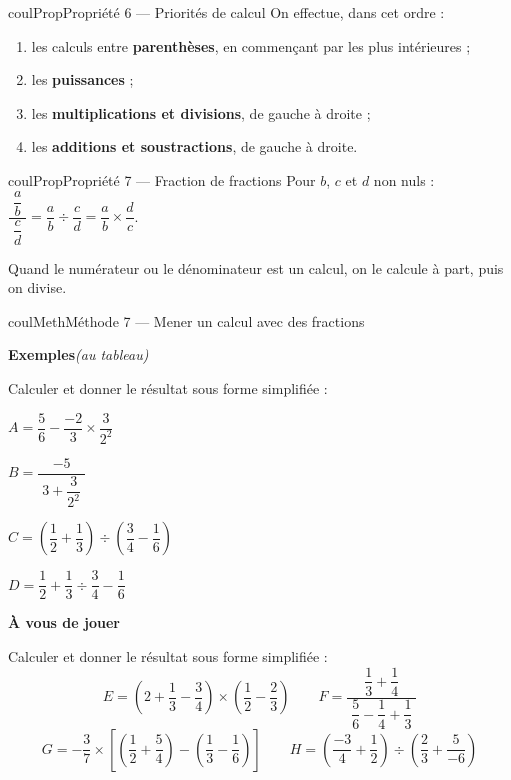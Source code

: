 \documentclass[11pt,a4paper]{article}
\makeatletter
\newcounter{lycee@signet}
\newcommand{\signet}[3][]{\stepcounter{lycee@signet}%
  \edef\lycee@dest{\if\relax\detokenize{#1}\relax
    signet.\arabic{lycee@signet}\else#1\fi}%
  \hypertarget{\lycee@dest}{}\bookmark[level=#2,dest=\lycee@dest]{#3}}
\newcounter{methode}
\newenvironment{proprietebox}[1][Propriété]%
  {\begin{boitecours}[phantom={\signet{2}{#1}}]{coulProp}{#1}}{\end{boitecours}}
\newenvironment{methodebox}[1][Méthode]{\stepcounter{methode}%
  \begin{boitecours}[phantom={\signet[methode-\arabic{methode}]{2}{#1}}]{coulMeth}{#1}}%
  {\end{boitecours}}
\newcommand{\etape}[1]{\par\smallskip\textbf{\color{coulMeth}#1}\par\nobreak\smallskip}
\newcommand{\autableau}{\hfill{\footnotesize\itshape\color{black!45}(au tableau)}}
\newcommand{\etapeexemples}{%
    \par\smallskip\textbf{\color{coulMeth}Exemples}\autableau\par\nobreak\smallskip}
\makeatother
\begin{document}
\begin{proprietebox}[Propriété 6 --- Priorités de calcul]
On effectue, dans cet ordre :
\begin{enumerate}[label=\arabic*.]
  \item les calculs entre \textbf{parenthèses}, en commençant par les plus intérieures ;
  \item les \textbf{puissances} ;
  \item les \textbf{multiplications et divisions}, de gauche à droite ;
  \item les \textbf{additions et soustractions}, de gauche à droite.
\end{enumerate}
\end{proprietebox}

\begin{proprietebox}[Propriété 7 --- Fraction de fractions]
Pour $b$, $c$ et $d$ non nuls : \quad
$\dfrac{\;\dfrac{a}{b}\;}{\;\dfrac{c}{d}\;}=\dfrac{a}{b}\div\dfrac{c}{d}=\dfrac{a}{b}\times\dfrac{d}{c}$.

\smallskip
Quand le numérateur ou le dénominateur est un calcul, on le calcule à part, puis on
divise.
\end{proprietebox}

\begin{methodebox}[Méthode 7 --- Mener un calcul avec des fractions]
\etapeexemples
Calculer et donner le résultat sous forme simplifiée :
\begin{questions}[label=\alph*)]
  \item $A=\dfrac{5}{6}-\dfrac{-2}{3}\times\dfrac{3}{2^{2}}$
  \item $B=\dfrac{-5}{\;3+\dfrac{3}{2^{2}}\;}$
  \item $C=\left(\dfrac{1}{2}+\dfrac{1}{3}\right)\div\left(\dfrac{3}{4}-\dfrac{1}{6}\right)$
  \item $D=\dfrac{1}{2}+\dfrac{1}{3}\div\dfrac{3}{4}-\dfrac{1}{6}$
\end{questions}

\etape{À vous de jouer}
Calculer et donner le résultat sous forme simplifiée :
\[
  E=\left(2+\dfrac{1}{3}-\dfrac{3}{4}\right)\times\left(\dfrac{1}{2}-\dfrac{2}{3}\right)
  \qquad
  F=\dfrac{\;\dfrac{1}{3}+\dfrac{1}{4}\;}{\;\dfrac{5}{6}-\dfrac{1}{4}+\dfrac{1}{3}\;}
\]
\[
  G=-\dfrac{3}{7}\times\left[\left(\dfrac{1}{2}+\dfrac{5}{4}\right)-\left(\dfrac{1}{3}-\dfrac{1}{6}\right)\right]
  \qquad
  H=\left(\dfrac{-3}{4}+\dfrac{1}{2}\right)\div\left(\dfrac{2}{3}+\dfrac{5}{-6}\right)
\]

\end{methodebox}
\end{document}
